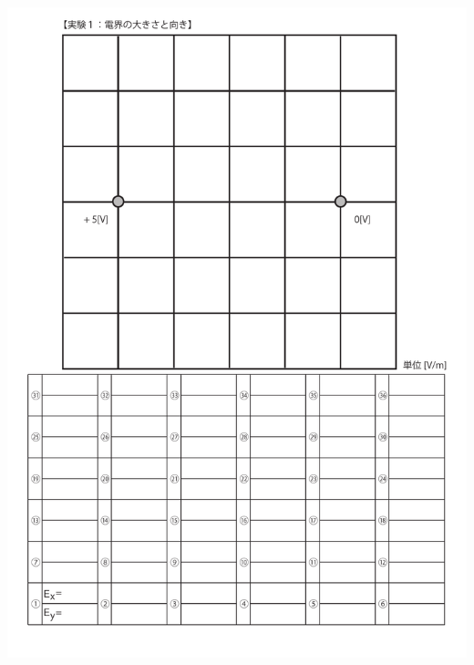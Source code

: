 \documentclass[uplatex,a4paper,11pt,oneside,openany]{jsbook}
\begin{document}
\includegraphics[scale=0.8]{./figure/E6.pdf}

\newpage
\end{document}
